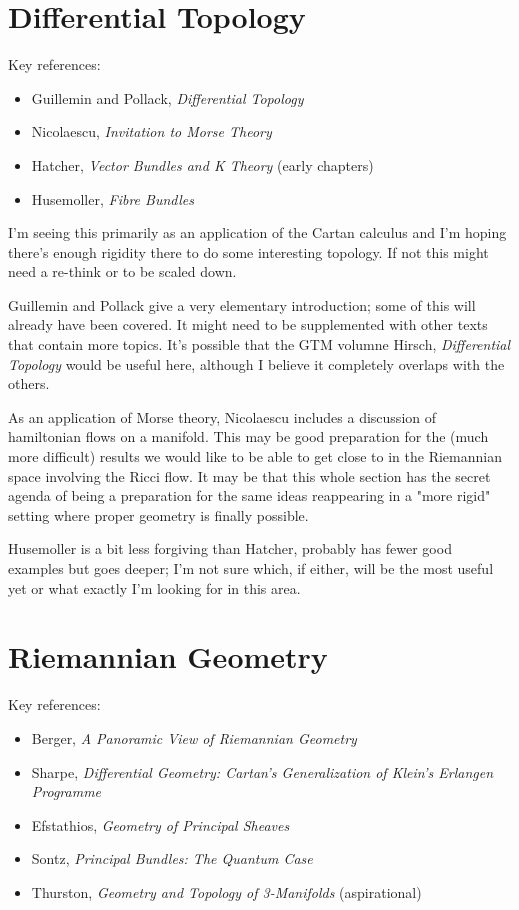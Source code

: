 \documentclass[article]{article}
\begin{document}
\section{Differential Topology}

Key references:
\begin{itemize}
	\item{Guillemin and Pollack, \textit{Differential Topology}}
	\item{Nicolaescu, \textit{Invitation to Morse Theory}}
	\item{Hatcher, \textit{Vector Bundles and K Theory} (early chapters)}
	\item{Husemoller, \textit{Fibre Bundles}}
\end{itemize}

I'm seeing this primarily as an application of the Cartan calculus and I'm hoping there's enough rigidity there to do some interesting topology. If not this might need a re-think or to be scaled down.

Guillemin and Pollack give a very elementary introduction; some of this will already have been covered. It might need to be supplemented with other texts that contain more topics. It's possible that the GTM volumne Hirsch, \textit{Differential Topology} would be useful here, although I believe it completely overlaps with the others.

As an application of Morse theory, Nicolaescu includes a discussion of hamiltonian flows on a manifold. This may be good preparation for the (much more difficult) results we would like to be able to get close to in the Riemannian space involving the Ricci flow. It may be that this whole section has the secret agenda of being a preparation for the same ideas reappearing in a "more rigid" setting where proper geometry is finally possible.

Husemoller is a bit less forgiving than Hatcher, probably has fewer good examples but goes deeper; I'm not sure which, if either, will be the most useful yet or what exactly I'm looking for in this area.

\section{Riemannian Geometry}

Key references:
\begin{itemize}
	\item{Berger, \textit{A Panoramic View of Riemannian Geometry}}
	\item{Sharpe, \textit{Differential Geometry: Cartan’s Generalization of Klein’s Erlangen Programme}}
	\item{Efstathios, \textit{Geometry of Principal Sheaves}}
	\item{Sontz, \textit{Principal Bundles: The Quantum Case}}
	\item{Thurston, \textit{Geometry and Topology of 3-Manifolds} (aspirational)}
\end{itemize}
\end{document}
